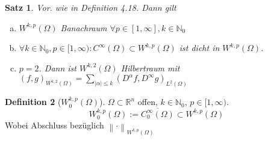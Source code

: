 \documentclass[ngerman]{report}
\theoremstyle{plain}%
\newtheorem{thm}{Satz}[chapter]
\theoremstyle{definition}%
\newtheorem{definition}[thm]{Definition}
\theoremstyle{myStyle}
\newcommand{\R}{\mathbb{R}}
\newcommand{\N}{\mathbb{N}}
\newcommand{\norm}[1]{\left \|#1\right\| }
\newcommand{\ov}[1]{\overline{#1}}
\begin{document}
	\begin{thm}
		Vor. wie in Definition 4.18. Dann gilt 
			\begin{enumerate}[a)]
				\item $W^{k,p}(\Omega)$ Banachraum $\forall p\in[1,\infty], k\in \N_0$
				\item $\forall k\in \N_0, p\in [1,\infty): C^\infty(\Omega) \subset W^{k,p}(\Omega)$ ist dicht in $W^{k,p}(\Omega)$.
				\item $p =2$. Dann ist $W^{k,2}(\Omega)$ Hilbertraum mit $(f,g)_{W^{k,2}(\Omega)} = \sum_{|\alpha| \leq k} (D^\alpha f, D^\infty g)_{L^2(\Omega)}$
			\end{enumerate}
	\end{thm}

	\begin{definition}[$W^{k,p}_0(\Omega)$]
		$\Omega \subset \R^n$ offen, $k\in \N_0$, $p\in [1,\infty)$.
			$$ W^{k,p}_0(\Omega) := \ov{C^\infty_0(\Omega)}\subset W^{k,p}(\Omega)$$ 
			Wobei Abschluss bezüglich $\norm{\cdot}_{W^{k,p}(\Omega)}$
	\end{definition}

\appendix 
\end{document}
